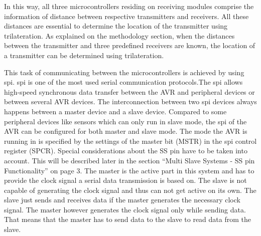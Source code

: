 In this way, all three microcontrollers residing on receiving modules comprise the information of distance between respective transmitters and receivers. All these distances are essential to determine the location of the transmitter using trilateration. As explained on the methodology section, when the distances between the transmitter and three predefined receivers are known, the location of a transmitter can be determined using trilateration.

This task of communicating between the microcontrollers is achieved by using \gls{spi}. \gls{spi} is one of the most used serial communication protocols.The \gls{spi} allows high-speed synchronous data transfer between the AVR and peripheral devices or between several AVR devices. The interconnection between two \gls{spi} devices always happens between a master device and a slave device. Compared to some peripheral devices like sensors which can only run in slave mode, the \gls{spi} of the AVR can be configured for both master and slave mode. The mode the AVR is running in is specified by the settings of the master bit (MSTR) in the \gls{spi} control register (SPCR). Special considerations about the SS pin have to be taken into account. This will be described later in the section “Multi Slave Systems - SS pin Functionality” on page 3. The master is the active part in this system and has to provide the clock signal a serial data transmission is based on. The slave is not capable of generating the clock signal and thus can not get active on its own. The slave just sends and receives data if the master generates the necessary clock signal. The master however generates the clock signal only while sending data. That means that the master has to send data to the slave to read data from the slave.

